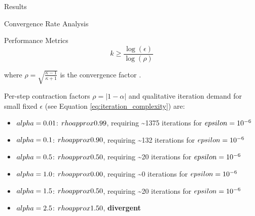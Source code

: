 \documentclass[
  ignorenonframetext,
]{beamer}
\providecommand{\tightlist}{%
  \setlength{\itemsep}{0pt}\setlength{\parskip}{0pt}}
\begin{document}
\begin{frame}[fragile]{Results}
\begin{block}{Convergence Rate Analysis}
\begin{block}{Performance Metrics}
\begin{equation}
\label{eq:iteration_complexity}
k \geq \frac{\log(\epsilon)}{\log(\rho)}
\end{equation}

where \(\rho = \sqrt{\frac{\kappa - 1}{\kappa + 1}}\) is the convergence
factor \cite{polyak1964some}.

Per-step contraction factors \(\rho = |1-\alpha|\) and qualitative
iteration demand for small fixed \(\epsilon\) (see Equation
\ref{eq:iteration_complexity}) are:

\begin{itemize}
\tightlist
\item
  \(\\alpha = 0.01\): \(\\rho \\approx 0.99\), requiring
  \textasciitilde1375 iterations for \(\\epsilon = 10^{-6}\)
\item
  \(\\alpha = 0.1\): \(\\rho \\approx 0.90\), requiring
  \textasciitilde132 iterations for \(\\epsilon = 10^{-6}\)
\item
  \(\\alpha = 0.5\): \(\\rho \\approx 0.50\), requiring
  \textasciitilde20 iterations for \(\\epsilon = 10^{-6}\)
\item
  \(\\alpha = 1.0\): \(\\rho \\approx 0.00\), requiring \textasciitilde0
  iterations for \(\\epsilon = 10^{-6}\)
\item
  \(\\alpha = 1.5\): \(\\rho \\approx 0.50\), requiring
  \textasciitilde20 iterations for \(\\epsilon = 10^{-6}\)
\item
  \(\\alpha = 2.5\): \(\\rho \\approx 1.50\), \textbf{divergent}
\end{itemize}
\end{block}
\end{block}


\end{frame}
\end{document}
